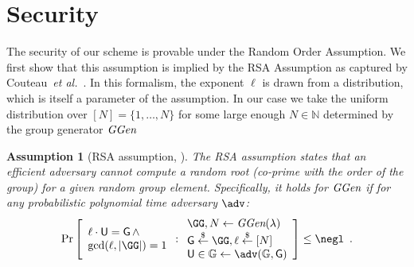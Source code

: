 \documentclass{article}
\theoremstyle{Definition}
\newtheorem{assumption}{Assumption}
\begin{document}
\section{Security}

The security of our scheme is provable under the Random Order Assumption. We first show that this assumption is implied by the RSA Assumption as captured by Couteau~\emph{et al.}~\cite{EC:CouPetPoi17}. In this formalism, the exponent $\ell$ is drawn from a distribution, which is itself a parameter of the assumption. In our case we take the uniform distribution over $[N] = \{1, \ldots, N\}$ for some large enough $N \in \mathbb{N}$ determined by the group generator $\textit{GGen}$

\begin{assumption}[RSA assumption, \cite{RivShaAdl78,EC:CouPetPoi17}]
	The RSA assumption states that an efficient adversary cannot compute a random root (co-prime with the order of the group) for a given random group element. Specifically, it holds for $\textit{GGen}$ if for any probabilistic polynomial time adversary $\adv$:
	\[
    \Pr\left[
    \begin{array}{l}
    \ell \cdot \gr{U} = \Generator \, \wedge \\
    \gcd(\ell,|\GG|)=1
    \end{array} :
    \begin{array}{l}
         \GG, N \leftarrow \ggen(\lambda)  \\
         \Generator \sample \GG, \ell \sample [N]  \\
         \gr{U} \in \mathbb{G} \leftarrow \adv(\mathbb{G}, \Generator) \\
    \end{array}\right] \leq \negl \enspace .
\]

\end{assumption}
\end{document}
